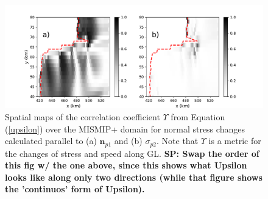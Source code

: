 \documentclass[review,oneside]{igs}
\begin{document}
\begin{figure}
	\centering
    \includegraphics[width=1\linewidth]{figs/stressDiff_velDiff_GL_allPerturb.pdf}
    \caption{Spatial maps of the correlation coefficient $\Upsilon$ from Equation (\ref{upsilon}) over the MISMIP+ domain for normal stress changes calculated parallel to (a) $\mathbf{n}_{p1}$  and (b) $\sigma_{p2}$. Note that $\Upsilon$ is a metric for the changes of stress and speed along GL. \textbf{SP: Swap the order of this fig w/ the one above, since this shows what Upsilon looks like along only two directions (while that figure shows the 'continuos' form of Upsilon).}}
	\label{stressDiff_velDiff_GL_allPerturb}
\end{figure}
\end{document}
